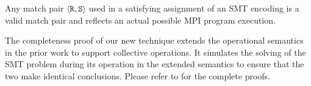\begin{lemma} \label{lem:bogus}
Any match pair $\langle \mathtt{R}, \mathtt{S}\rangle$ used in a
satisfying assignment of an SMT encoding is a valid match pair and
reflects an actual possible MPI program execution.
\end{lemma}

The completeness proof of our new technique extends the operational semantics in the prior work to support collective operations. It simulates the solving of the SMT problem during its operation in the extended semantics to ensure that the two make identical conclusions. Please refer to \cite{DBLP:conf/kbse/HuangMM13} for the complete proofs.

%

